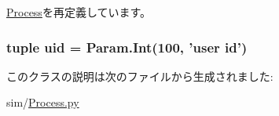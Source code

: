 \hyperlink{classProcess_1_1Process_acce15679d830831b0bbe8ebc2a60b2ca}{Process}を再定義しています。\hypertarget{classProcess_1_1LiveProcess_a769779ff2ed72928f198f7facc70ec85}{
\subsubsection[{uid}]{\setlength{\rightskip}{0pt plus 5cm}tuple {\bf uid} = Param.Int(100, 'user id')}}
\label{classProcess_1_1LiveProcess_a769779ff2ed72928f198f7facc70ec85}


このクラスの説明は次のファイルから生成されました:\begin{DoxyCompactItemize}
\item 
sim/\hyperlink{Process_8py}{Process.py}\end{DoxyCompactItemize}
